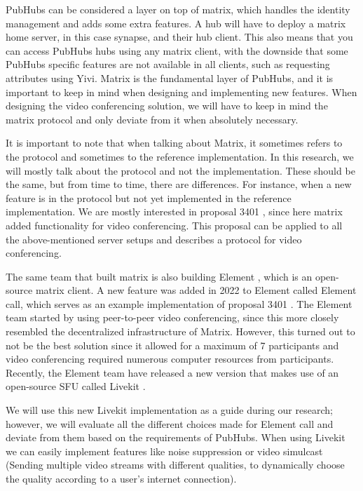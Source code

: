\documentclass{report}
\begin{document}
PubHubs can be considered a layer on top of matrix, which handles the identity management and adds some extra features.
A hub will have to deploy a matrix home server, in this case synapse, and their hub client. This also means that you can
access PubHubs hubs using any matrix client, with the downside that some PubHubs specific features are not available in
all clients, such as requesting attributes using Yivi. Matrix is the fundamental layer of PubHubs, and it is
important to keep in mind when designing and implementing new features. When designing the video conferencing
solution, we will have to keep in mind the matrix protocol and only deviate from it when absolutely necessary.

It is important to note that when talking about Matrix, it sometimes refers to the protocol and sometimes to the
reference implementation. In this research, we will mostly talk about the protocol and not the implementation. These
should be the same, but from time to time, there are differences. For instance, when a new feature is in the protocol
but not yet implemented in the reference implementation. We are mostly interested in proposal 3401 \cite{
noauthor_matrix-spec-proposalsproposals3401-group-voipmd_nodate}, since here matrix added functionality for video conferencing. This proposal
can be applied to all the above-mentioned server setups and describes a protocol for video conferencing.

The same team that built matrix is also building Element \cite{noauthor_element_nodate}, which is an open-source matrix client.
A new feature was added in 2022 \cite{noauthor_introducing_2022} to Element called Element call, which serves as an
example implementation of proposal 3401 \cite{noauthor_matrix-spec-proposalsproposals3401-group-voipmd_nodate}.
The Element team started by using peer-to-peer video conferencing, since this more closely resembled the decentralized
infrastructure of Matrix. However, this turned out to not be the best solution since it allowed for a maximum of 7
participants and video conferencing required numerous computer  resources from participants. Recently, the Element team
have released a new version that makes use of an open-source SFU called Livekit \cite{noauthor_livekit_nodate}.

We will use this new Livekit implementation as a guide during our research; however, we will evaluate all the different
choices made for Element call and deviate from them based on the requirements of PubHubs. When using Livekit we can
easily implement features like noise suppression or video simulcast (Sending multiple video streams with different
qualities, to dynamically choose the quality according to a user's internet connection).
\end{document}
